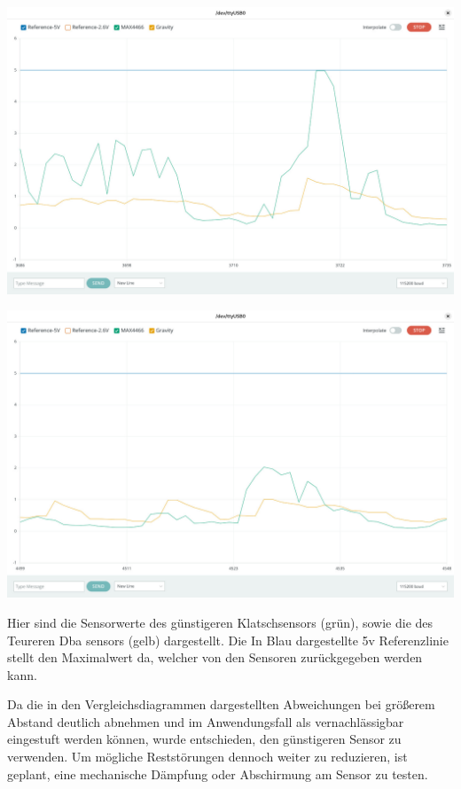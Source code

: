 \begin{center}
  \includegraphics[width=1\textwidth]{../images/Sensorvergleich/PeekSensorVergleich.jpeg}
\end{center}
\begin{center}
  \includegraphics[width=1\textwidth]{../images/Sensorvergleich/StaticSensorVergleich.jpeg}
\end{center}

Hier sind die Sensorwerte des günstigeren Klatschsensors (grün), sowie die des Teureren Dba sensors (gelb) dargestellt. Die In Blau dargestellte 5v Referenzlinie stellt den Maximalwert da, welcher von den Sensoren zurückgegeben werden kann.

Da die in den Vergleichsdiagrammen dargestellten Abweichungen bei größerem Abstand deutlich abnehmen und im Anwendungsfall als vernachlässigbar eingestuft werden können, wurde entschieden, den günstigeren Sensor zu verwenden. 
Um mögliche Reststörungen dennoch weiter zu reduzieren, ist geplant, eine mechanische Dämpfung oder Abschirmung am Sensor zu testen.

